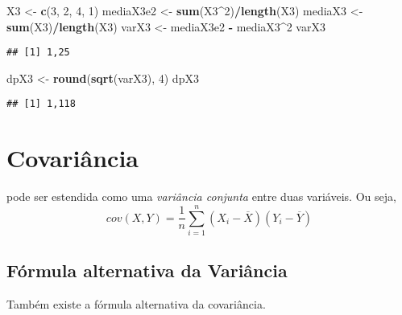 \documentclass[
]{book}
\newenvironment{Shaded}{\begin{snugshade}}{\end{snugshade}}
\newcommand{\DecValTok}[1]{\textcolor[rgb]{0.00,0.00,0.81}{#1}}
\newcommand{\KeywordTok}[1]{\textcolor[rgb]{0.13,0.29,0.53}{\textbf{#1}}}
\newcommand{\NormalTok}[1]{#1}
\newcommand{\OperatorTok}[1]{\textcolor[rgb]{0.81,0.36,0.00}{\textbf{#1}}}
\newcommand{\StringTok}[1]{\textcolor[rgb]{0.31,0.60,0.02}{#1}}
\begin{document}
\begin{Shaded}
\begin{Highlighting}[]
\NormalTok{X3 <-}\StringTok{ }\KeywordTok{c}\NormalTok{(}\DecValTok{3}\NormalTok{, }\DecValTok{2}\NormalTok{, }\DecValTok{4}\NormalTok{, }\DecValTok{1}\NormalTok{)}
\NormalTok{mediaX3e2 <-}\StringTok{ }\KeywordTok{sum}\NormalTok{(X3}\OperatorTok{^}\DecValTok{2}\NormalTok{)}\OperatorTok{/}\KeywordTok{length}\NormalTok{(X3)}
\NormalTok{mediaX3 <-}\StringTok{ }\KeywordTok{sum}\NormalTok{(X3)}\OperatorTok{/}\KeywordTok{length}\NormalTok{(X3)}
\NormalTok{varX3 <-}\StringTok{ }\NormalTok{mediaX3e2 }\OperatorTok{-}\StringTok{ }\NormalTok{mediaX3}\OperatorTok{^}\DecValTok{2}
\NormalTok{varX3}
\end{Highlighting}
\end{Shaded}

\begin{verbatim}
## [1] 1,25
\end{verbatim}

\begin{Shaded}
\begin{Highlighting}[]
\NormalTok{dpX3 <-}\StringTok{ }\KeywordTok{round}\NormalTok{(}\KeywordTok{sqrt}\NormalTok{(varX3), }\DecValTok{4}\NormalTok{)}
\NormalTok{dpX3}
\end{Highlighting}
\end{Shaded}

\begin{verbatim}
## [1] 1,118
\end{verbatim}

\hypertarget{covariuxe2ncia}{%
\section{Covariância}\label{covariuxe2ncia}}

pode ser estendida como uma \emph{variância conjunta} entre duas variáveis. Ou seja,
\begin{equation*}
  cov(X,Y) = \frac{1}{n}\sum_{i=1}^{n}(X_i - \overline{X})(Y_i - \overline{Y})
\end{equation*}

\hypertarget{fuxf3rmula-alternativa-da-variuxe2ncia-1}{%
\subsection{Fórmula alternativa da Variância}\label{fuxf3rmula-alternativa-da-variuxe2ncia-1}}

Também existe a fórmula alternativa da covariância.
\end{document}
